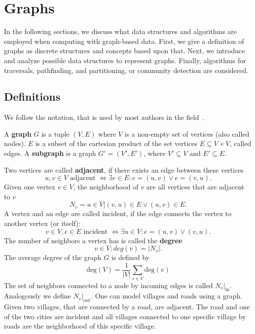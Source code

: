 \chapter{Graphs}\label{\positionnumber}
    In the following sections, we discuss what data structures and algorithms are employed when computing with graph-based data.
    First, we give a definition of graphs as discrete structures and concepts based upon that. 
    Next, we introduce and analyze possible data structures to represent graphs. 
    Finally, algorithms for traversals, pathfinding, and partitioning, or community detection are considered.
    
    \section{Definitions}\label{\positionnumber}
        We follow the notation, that is used by most authors in the field~\autocite{steger2007diskrete, Gross1998GraphTA, aho1974design, cormen2009introduction, Goodrich2014AlgorithmDA}.
    
        A \textbf{graph} $G$ is a tuple $(V, E)$ where $V$ is a non-empty set of vertices (also called nodes). 
        $E$ is a subset of the cartesian product of the set vertices $E \subseteq V \times V$, called edges.
        A \textbf{subgraph} is a graph $G' = (V', E')$, where $V' \subseteq V$ and $E' \subseteq E$. 
        
        Two vertices are called \textbf{adjacent}, if there exists an edge between these vertices
        \[ u,v \in V \text{ adjacent } \Leftrightarrow \exists e \in E: e = (u, v) \vee e= (v, u).\]
        Given one vertex $v \in V$, the neighborhood of $v$ are all vertices that are adjacent to $v$
        \[N_v = {u \in V | (v, u) \in E \vee (u, v) \in E}.\] 
        A vertex and an edge are called incident, if the edge connects the vertex to another vertex (or itself): 
        \[v \in V, e\in E \text{ incident } \Leftrightarrow \exists u \in V: e = (u,v) \vee (v,u).\]
        The number of neighbors a vertex has is called the \textbf{degree}
        \[v \in V: deg(v) = |N_v|.\]
        The average degree of the graph $G$ is defined by
        \[ \text{deg}(V) = \frac{1}{|V|} \sum_{v \in V}\text{deg}(v)\]
        The set of neighbors connected to a node by incoming edges is called $N_v |_\text{in}$. Analogously we define $N_v |_\text{out}$.             
        One can model villages and roads using a graph. 
        Given two villages, that are connected by a road, are adjacent. 
        The road and one of the two cities are incident and all villages connected to one specific village by roads are the neighborhood of this specific village. 
        
